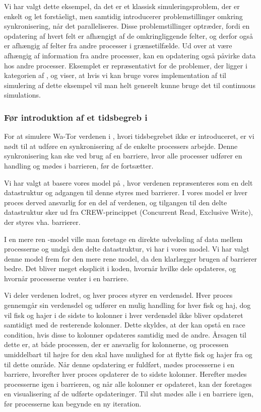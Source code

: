 Vi har valgt dette eksempel, da det er et klassisk simuleringsproblem, der er enkelt og let forståeligt, men samtidig 
introducerer problemstillinger omkring synkronisering, når det paralleliseres.  
Disse problemstillinger optræder, fordi en opdatering af hvert felt er afhængigt 
af de omkringliggende felter, og derfor også er afhængig af felter fra andre 
processer i grænsetilfælde. Ud over at være afhængig af information fra andre 
processer, kan en opdatering også påvirke data hos andre processer. Eksemplet er repræsentativt for de problemer, der ligger i kategorien af , og viser, at hvis vi kan bruge vores implementation af \des til simulering af dette eksempel vil man helt generelt kunne bruge det til continuous simulations.

\subsubsection{Før introduktion af et tidsbegreb i \pycsp}
For at simulere Wa-Tor verdenen i \pycsp, hvori tidsbegrebet ikke er introduceret, er vi nødt 
til at udføre en synkronisering af de enkelte processers arbejde. Denne 
synkronisering kan ske ved brug af en barriere, hvor alle processer udfører en 
handling og mødes i barrieren, før de fortsætter.

Vi har valgt at basere vores model på \cite{crew}, hvor verdenen repræsenteres 
som en delt datastruktur og adgangen til denne styres med barrierer. I vores 
model er hver proces derved ansvarlig for en del af verdenen, og tilgangen til 
den delte datastruktur sker ud fra CREW-princippet (Concurrent Read, Exclusive 
Write)\cite[5]{crew}, der styres vha. barrierer.  

I en mere ren \csp-model ville man foretage en direkte udveksling af data mellem 
processerne og undgå den delte datastruktur, vi har i vores model.  Vi har 
valgt denne model frem for den mere rene \csp model, da den klarlægger brugen af 
barrierer bedre.  Det bliver meget eksplicit i koden, hvornår hvilke dele 
opdateres, og hvornår processerne venter i en barriere.

Vi deler verdenen lodret, og hver proces styrer en verdensdel. Hver proces 
gennemgår sin verdensdel og udfører en mulig handling for hver fisk og haj, dog 
vil fisk og hajer i de sidste to kolonner i hver verdensdel ikke bliver 
opdateret samtidigt med de resterende kolonner. Dette skyldes, at der kan opstå en race 
condition, hvis disse to kolonner opdateres samtidig med de andre. Årsagen til 
dette er, at både processen, der er ansvarlig for kolonnerne, og processen 
umiddelbart til højre for den skal have mulighed for at flytte fisk og hajer fra og til dette område. 
Når denne 
opdatering er fuldført, mødes processerne i en barriere, hvorefter hver proces 
opdaterer de to sidste kolonner. Herefter mødes processerne igen i barrieren, 
og når alle kolonner er opdateret, kan der foretages en visualisering af de 
udførte opdateringer. Til slut mødes alle i en barriere igen, før processerne 
kan begynde en ny iteration.

